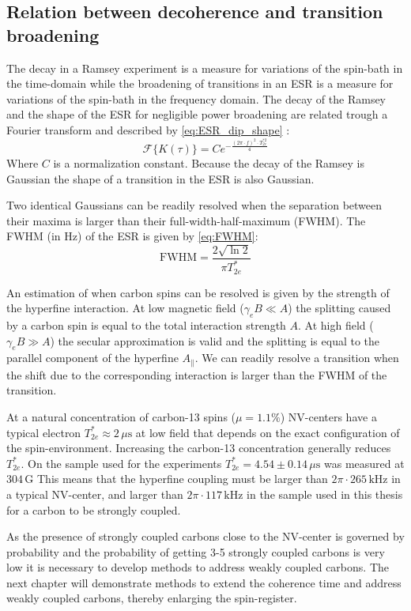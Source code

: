 \subsection{Relation between decoherence and transition broadening}
The decay in a Ramsey experiment is a measure for variations of the spin-bath in the time-domain while the broadening of transitions in an ESR is a measure for variations of the spin-bath in the frequency domain.
The decay of the Ramsey and the shape of the ESR for negligible power broadening are related trough a Fourier transform and described by \cref{eq:ESR_dip_shape} :
\begin{equation}
    \mathcal{F} \{ K(\tau) \} =  C e^{-\tfrac{(2\pi \cdot f) ^2 \cdot T_{2e}^{*2}}{ 4}}
    \label{eq:ESR_dip_shape}
\end{equation}
Where $C$ is a normalization constant.
Because the decay of the Ramsey is Gaussian the shape of a transition in the ESR is also Gaussian.

Two identical Gaussians can be readily resolved when the separation between their maxima is larger than their full-width-half-maximum (FWHM).
The FWHM (in Hz) of the ESR is given by \cref{eq:FWHM}:
\begin{equation}
    \mathrm{FWHM} =  \frac{2\sqrt{\ln{2}}}{\pi T_{2e}^*}
    \label{eq:FWHM}
\end{equation}

An estimation of when carbon spins can be resolved is given by the strength of the hyperfine interaction.
At low magnetic field ($\gamma_e B \ll A$) the splitting caused by a carbon spin is equal to the total interaction strength $A$.
At high field ($\gamma_e B \gg A$) the secular approximation is valid and the splitting is equal to the parallel component of the hyperfine $A_\parallel$.
We can readily resolve a transition when the shift due to the corresponding interaction is larger than the FWHM of the transition.

At a natural concentration of carbon-13 spins ($\mu =1.1\%$) NV-centers have a typical  electron $T_{2e}^* \approx 2\,\mu \mathrm{s}$ at low field that depends on the exact configuration of the spin-environment.
Increasing the carbon-13 concentration generally reduces $T_{2e}^*$.
On the sample used for the experiments $T_{2e}^*=4.54 \pm 0.14\, \mu\mathrm{s}$ was measured at $304\, \mathrm{G}$
This means that the hyperfine coupling must be larger than $2\pi\cdot 265\,\mathrm{kHz}$ in a typical NV-center, and larger than $2\pi\cdot 117\, \mathrm{kHz}$ in the sample used in this thesis for a carbon to be strongly coupled.

As the presence of strongly coupled carbons close to the NV-center is governed by probability and the probability of getting 3-5 strongly coupled carbons is very low it is necessary to develop methods to address weakly coupled carbons.
The next chapter will demonstrate methods to extend the coherence time and address weakly coupled carbons, thereby enlarging the spin-register.

